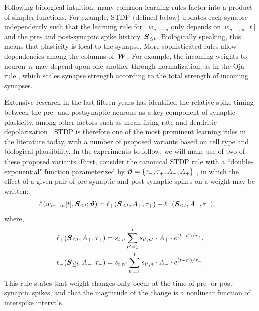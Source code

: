 Following biological intuition, many common learning rules factor into
a product of simpler functions. For example, STDP (defined below)
updates each synapse independently such that the learning rule for 
~$w_{n' \to n}$ only
depends on~${w_{n'\to n}[t]}$ and the pre- and post-synaptic spike
history~${\boldsymbol{S}_{\leq t}}$. Biologically speaking, this means that
plasticity is local to the synapse. More sophisticated rules allow
dependencies among the columns of~$\boldsymbol{W}$. For example, the incoming
weights to neuron~$n$ may depend upon one another through
normalization, as in the Oja rule \cite{Oja-1982}, which scales
synapse strength according to the total strength of incoming synapses.

\sloppy 
Extensive research in the last fifteen years has identified the
relative spike timing between the pre- and postsynaptic neurons as a
key component of synaptic plasticity, among other factors such as mean
firing rate and dendritic depolarization \cite{Feldman-2012}. STDP is
therefore one of the most prominent learning rules in the literature
today, with a number of proposed variants based on cell type and
biological plausibility. In the experiments to follow, we will make
use of two of these proposed variants. First, consider the canonical
STDP rule with a ``double-exponential" function parameterized by
${\boldsymbol{\vartheta} = \{\tau_-, \tau_+, A_-, A_+\}}$ \cite{Song-2000}, in which the
effect of a given pair of pre-synaptic and post-synaptic spikes on a
weight may be written:
\begin{align}
\label{eqn:AddSTDP}
 \ell\left(w_{n' \to n}[t], \boldsymbol{S}_{\leq t}; \boldsymbol{\vartheta} \right) &= 
 \ell_+(\boldsymbol{S}_{\leq t}, A_+, \tau_+) 
 -\ell_-(\boldsymbol{S}_{\leq t}, A_-, \tau_-),
\end{align}
where,
\begin{align*}
\ell_+(\boldsymbol{S}_{\leq t}, A_+, \tau_+) &= s_{t,n} \sum_{t'=1}^{t} s_{t', n'} \cdot  A_+ \cdot e^{(t-t')/\tau_+}, \\
\ell_-(\boldsymbol{S}_{\leq t}, A_-, \tau_-) &= s_{t,n'} \sum_{t'=1}^{t} s_{t', n} \cdot  A_- \cdot e^{(t-t')/\tau_-}.
\end{align*}
This rule states that weight changes only occur at the time of pre- or
post-synaptic spikes, and that the magnitude of the change is a
nonlinear function of interspike intervals.

